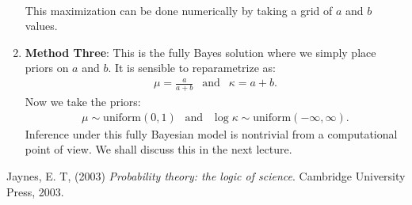 \documentclass{scrartcl}
\begin{document}
\begin{enumerate}
\begin{align*}
  \end{align*}
  This maximization can be done numerically by taking a grid of $a$
  and $b$ values.
\item \textbf{Method Three}: This is the fully Bayes solution where we
  simply place priors on $a$ and $b$. It is sensible to reparametrize
  as:
  \begin{align*}
    \mu = \frac{a}{a+b} ~~ \text{ and } ~~ \kappa = a + b. 
  \end{align*}
  Now we take the priors:
  \begin{align*}
    \mu \sim \text{uniform}(0, 1) ~~ \text{ and } ~~ \log \kappa \sim
    \text{uniform}(-\infty, \infty). 
  \end{align*}
  Inference under this fully Bayesian model is nontrivial from a
  computational point of view. We shall discuss this in the next
  lecture. 
\end{enumerate}




\begin{thebibliography}{99}

  

      Jaynes, E. T, (2003)
  \textit{Probability theory: the logic of science}. Cambridge
  University Press, 2003.







\end{thebibliography}
\end{document}
